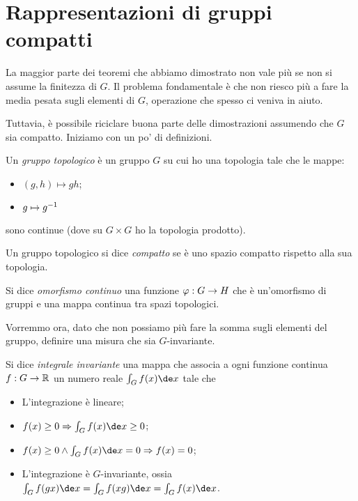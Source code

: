\section{Rappresentazioni di gruppi compatti}
	La maggior parte dei teoremi che abbiamo dimostrato non vale più se non si assume la finitezza di $G$. Il problema fondamentale è che non riesco più a fare la media pesata sugli elementi di $G$, operazione che spesso ci veniva in aiuto.
	
	Tuttavia, è possibile riciclare buona parte delle dimostrazioni assumendo che $G$ sia compatto. Iniziamo con un po' di definizioni.
	
	\begin{mydef}
		Un \emph{gruppo topologico} è un gruppo $G$ su cui ho una topologia tale che le mappe:
		\begin{itemize}
		 \item $(g,h) \mapsto gh$;
		 \item $g \mapsto g^{-1}$
		\end{itemize}
		sono continue (dove su $G\times G$ ho la topologia prodotto).
	\end{mydef}
	
	\begin{mydef}
		Un gruppo topologico si dice \emph{compatto} se è uno spazio compatto rispetto alla sua topologia.
	\end{mydef}
	
	\begin{mydef}
		Si dice \emph{omorfismo continuo} una funzione $\varphi: G\rightarrow H$ che è un'omorfismo di gruppi e una mappa continua tra spazi topologici.  
	\end{mydef}

	Vorremmo ora, dato che non possiamo più fare la somma sugli elementi del gruppo, definire una misura che sia $G$-invariante. 
	\begin{mydef}
		Si dice \emph{integrale invariante} una mappa che associa a ogni funzione continua $f: G \rightarrow \mathbb R$ un numero reale $\int_G f(x) \de x$ tale che 
		\begin{itemize}
		 \item L'integrazione è lineare;
		 \item $f(x)\ge 0 \Rar \haar{f(x)} \ge 0$;
		 \item $f(x)\ge 0 \wedge \haar{f(x)} = 0 \Rar f(x)=0$; 
		 \item L'integrazione è $G$-invariante, ossia $\haar{f(gx)}=\haar{f(xg)}=\haar{f(x)}$.
		\end{itemize}
	\end{mydef}
	
